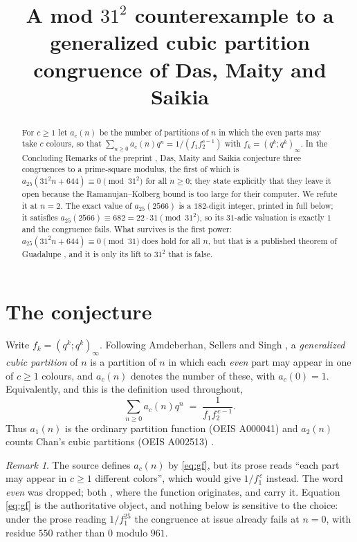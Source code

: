 \documentclass[11pt]{amsart}
\title[A mod $31^2$ counterexample to a cubic partition congruence]
{A mod $31^2$ counterexample to a generalized cubic partition congruence
of Das, Maity and Saikia}
\date{}
\theoremstyle{remark}
\newtheorem{remark}[theorem]{Remark}
\begin{document}
\begin{abstract}
For $c\ge1$ let $a_c(n)$ be the number of partitions of $n$ in which the even
parts may take $c$ colours, so that $\sum_{n\ge0}a_c(n)q^n=1/(f_1f_2^{c-1})$
with $f_k=(q^k;q^k)_\infty$. In the Concluding Remarks of the preprint
\cite{DasMaitySaikia}, Das, Maity and Saikia conjecture three congruences to a
prime-square modulus, the first of which is
$a_{25}(31^2n+644)\equiv0\pmod{31^2}$ for all $n\ge0$; they state explicitly
that they leave it open because the Ramanujan--Kolberg bound is too large for
their computer. We refute it at $n=2$. The exact value of $a_{25}(2566)$ is a
$182$-digit integer, printed in full below; it satisfies
$a_{25}(2566)\equiv682=22\cdot31\pmod{31^2}$, so its $31$-adic valuation is
exactly $1$ and the congruence fails. What survives is
the first power: $a_{25}(31^2n+644)\equiv0\pmod{31}$ does hold for all $n$, but
that is a published theorem of Guadalupe \cite{Guadalupe}, and it is only its
lift to $31^2$ that is false.
\end{abstract}

\maketitle

\section{The conjecture}\label{sec:conj}

Write $f_k=(q^k;q^k)_\infty$. Following Amdeberhan, Sellers and Singh
\cite{ASS}, a \emph{generalized cubic partition} of $n$ is a partition of $n$ in
which each \emph{even} part may appear in one of $c\ge1$ colours, and $a_c(n)$
denotes the number of these, with $a_c(0)=1$. Equivalently, and this is the
definition used throughout,
\begin{equation}\label{eq:gf}
  \sum_{n\ge0}a_c(n)q^n \;=\; \frac{1}{f_1 f_2^{\,c-1}}.
\end{equation}
Thus $a_1(n)$ is the ordinary partition function (OEIS A000041) and $a_2(n)$
counts Chan's cubic partitions (OEIS A002513) \cite{OEIS}.

\begin{remark}\label{rem:defn}
The source \cite{DasMaitySaikia} defines $a_c(n)$ by \eqref{eq:gf}, but its
prose reads ``each part may appear in $c\ge1$ different colors'', which would
give $1/f_1^{\,c}$ instead. The word \emph{even} was dropped; both \cite{ASS},
where the function originates, and \cite{Guadalupe} carry it. Equation
\eqref{eq:gf} is the authoritative object, and nothing below is sensitive to the
choice: under the prose reading $1/f_1^{25}$ the congruence at issue already
fails at $n=0$, with residue $550$ rather than $0$ modulo $961$.
\end{remark}
\end{document}
